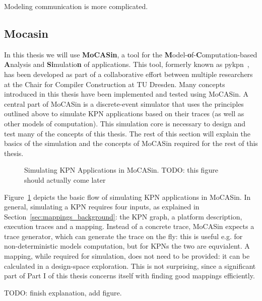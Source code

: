 Modeling communication is more complicated.
\subsection{Mocasin}

In this thesis we will use \textbf{MoCASin}, a tool for the \textbf{M}odel-\textbf{o}f-\textbf{C}omputation-based \textbf{A}nalysis and \textbf{Si}mulatio\textbf{n} of applications. This tool, formerly known as pykpn~\cite{goens_mcsoc18}, has been developed as part of a collaborative effort between multiple researchers at the Chair for Compiler Construction at TU Dresden. Many concepts introduced in this thesis have been implemented and tested using MoCASin. A central part of MoCASin is a discrete-event simulator that uses the principles outlined above to simulate KPN applications based on their traces (as well as other models of computation). This simulation core is necessary to design and test many of the concepts of this thesis. The rest of this section will explain the basics of the simulation and the concepts of MoCASin required for the rest of this thesis.

\begin{figure}[h]
	\centering
   \resizebox{0.95\textwidth}{!}{}
	\caption{Simulating KPN Applications in MoCASin. TODO: this figure should actually come later}
	\label{fig:mocasin_kpn_simulation}
\end{figure}

Figure~\ref{fig:mocasin_kpn_simulation} depicts the basic flow of simulating KPN applications in MoCASin. In general, simulating a KPN requires four inputs, as explained in Section~\ref{sec:mappings_background}: the KPN graph, a platform description, execution traces and a mapping. Instead of a concrete trace, MoCASin expects a trace generator, which can generate the trace on the fly: this is useful e.g. for non-deterministic models computation, but for KPNs the two are equvialent. A mapping, while required for simulation, does not need to be provided: it can be calculated in a design-space exploration. This is not surprising, since a significant part of Part I of this thesis concerns itself with finding good mappings efficiently.

TODO: finish explanation, add figure.